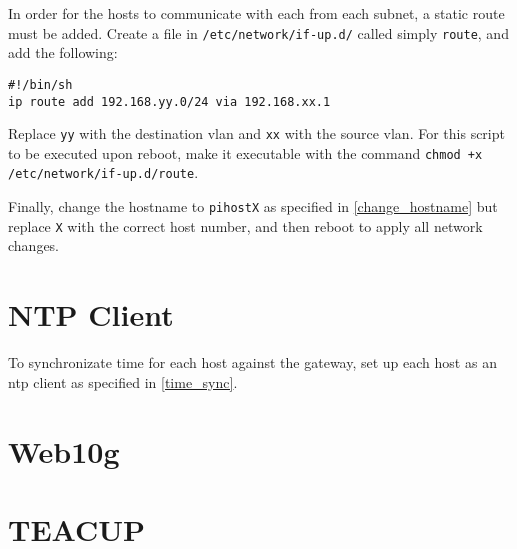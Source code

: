 In order for the hosts to communicate with each from each subnet, a static route must be added. Create a file in \lstinline{/etc/network/if-up.d/} called simply \lstinline{route}, and add the following:

\begin{lstlisting}
#!/bin/sh
ip route add 192.168.yy.0/24 via 192.168.xx.1
\end{lstlisting}

Replace \lstinline{yy} with the destination \gls{vlan} and \lstinline{xx} with the source \gls{vlan}. For this script to be executed upon reboot, make it executable with the command \lstinline{chmod +x /etc/network/if-up.d/route}.

Finally, change the hostname to \lstinline{pihostX} as specified in \ref{change_hostname} but replace \lstinline{X} with the correct host number, and then reboot to apply all network changes.


\section{NTP Client}

To synchronizate time for each host against the gateway, set up each host as an \gls{ntp} client as specified in \ref{time_sync}.

\section{Web10g}



\section{TEACUP}

